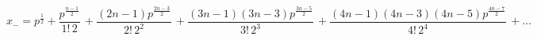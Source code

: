 \begin{equation}
x_{-}=p^{\frac{1}{2}}+\frac{ p^{\frac{n-1}{2}}
}{1!\,2}\,+\frac{ \left (2n-1\right )p^{\frac{2n-3}{2}}  }{2!\,2^2}\,+\frac{  \left (3n-1
\right )\left (3n-3\right )p^{\frac{3n-5}{2}}  }{3!\,2^3}\,+
\frac{ \left (4n-1\right )\left (4n-3\right )\left (4n-5
\right )p^{\frac{4n-7}{2}}  }{4!\,2^4}\,+\dots  \label{ser2}
\end{equation}

